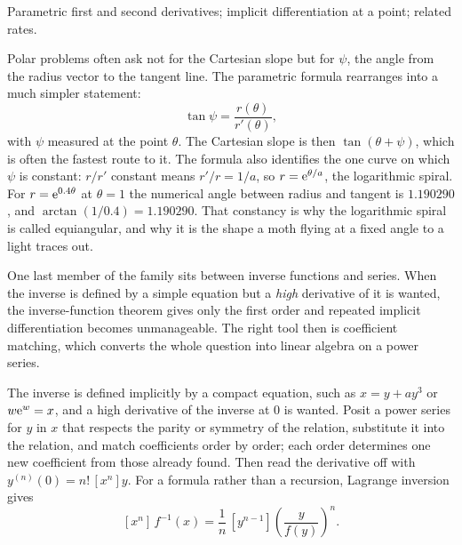 \begin{seealsob}Parametric first and second derivatives; implicit differentiation at a point; related rates.\end{seealsob}

\begin{keynote}
Polar problems often ask not for the Cartesian slope but for $\psi$, the angle from the radius vector to the tangent line. The parametric formula rearranges into a much simpler statement:
\[
\tan\psi=\frac{r(\theta)}{r'(\theta)} ,
\]
with $\psi$ measured at the point $\theta$. The Cartesian slope is then $\tan(\theta+\psi)$, which is often the fastest route to it. The formula also identifies the one curve on which $\psi$ is constant: $r/r'$ constant means $r'/r=1/a$, so $r=\mathrm{e}^{\theta/a}$, the logarithmic spiral. For $r=\mathrm{e}^{0.4\theta}$ at $\theta=1$ the numerical angle between radius and tangent is $1.190290$, and $\arctan(1/0.4)=1.190290$. That constancy is why the logarithmic spiral is called equiangular, and why it is the shape a moth flying at a fixed angle to a light traces out.
\end{keynote}

One last member of the family sits between inverse functions and series. When the inverse is defined by a simple equation but a \emph{high} derivative of it is wanted, the inverse-function theorem gives only the first order and repeated implicit differentiation becomes unmanageable. The right tool then is coefficient matching, which converts the whole question into linear algebra on a power series.

\cue The inverse is defined implicitly by a compact equation, such as $x=y+ay^{3}$ or $w\mathrm{e}^{w}=x$, and a high derivative of the inverse at $0$ is wanted.
\method Posit a power series for $y$ in $x$ that respects the parity or symmetry of the relation, substitute it into the relation, and match coefficients order by order; each order determines one new coefficient from those already found. Then read the derivative off with $y^{(n)}(0)=n!\,[x^{n}]y$. For a formula rather than a recursion, Lagrange inversion gives
\[
[x^{n}]\,f^{-1}(x)=\frac1n\,[y^{n-1}]\left(\frac{y}{f(y)}\right)^{n}.
\]

